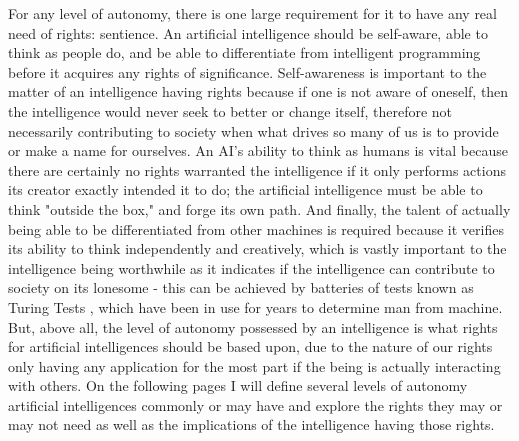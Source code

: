 For any level of autonomy, there is one large requirement for it to have any real need of rights: sentience. An artificial intelligence should be self-aware, able to think as people do, and be able to differentiate from intelligent programming before it acquires any rights of significance. Self-awareness is important to the matter of an intelligence having rights because if one is not aware of oneself, then the intelligence would never seek to better or change itself, therefore not necessarily contributing to society when what drives so many of us is to provide or make a name for ourselves. An AI's ability to think as humans is vital because there are certainly no rights warranted the intelligence if it only performs actions its creator exactly intended it to do; the artificial intelligence must be able to think "outside the box," and forge its own path. And finally, the talent of actually being able to be differentiated from other machines is required because it verifies its ability to think independently and creatively, which is vastly important to the intelligence being worthwhile as it indicates if the intelligence can contribute to society on its lonesome - this can be achieved by batteries of tests known as Turing Tests \cite{sep-turing-test}, which have been in use for years to determine man from machine. But, above all, the level of autonomy possessed by an intelligence is what rights for artificial intelligences should be based upon, due to the nature of our rights only having any application for the most part if the being is actually interacting with others. On the following pages I will define several levels of autonomy artificial intelligences commonly or may have and explore the rights they may or may not need as well as the implications of the intelligence having those rights.